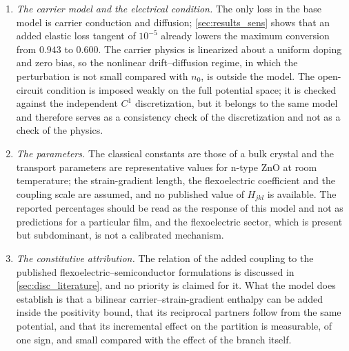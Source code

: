 \begin{enumerate}
scattering result does not rest on it.  The same holds for the traction itself: the weak
form of the edge condition closes to machine precision, but the pointwise traction is not identically zero.  At the
operating point its normalized norm away from the corners is $4.3\times10^{-2}$ at degree 10 and
$3.6\times10^{-2}$ at degree 28, while its maximum over the edge, which sits at the corners,
grows from $0.77$ to $2.4$ over the same range.  The free edge is therefore satisfied in the weak sense,
and a direct two-dimensional $x$--$z$ finite-element solution of the same variational problem, with the edge cells refined down to $0.00125\,d$, reproduces the modal backward share at the operating point to within $0.5$~\% (\cref{tab:fe2d}), with no systematic drift under refinement.  That check is made at the operating point only.  The same measurements settle what the
earlier band-energy argument could not: the strain-gradient energy in the outer
band $|z|>0.4\,d/2$ is $0.93$--$1.00$~\% of the total at the operating point,
$1.22$--$1.30$~\% at the maximum and $1.18$--$1.26$~\% at $k_xd=0.55$, and its
share decreases with degree, but the band average of the mixed hyperstress
exceeds the pointwise corner value by factors of five to ten, so no band average
is used here to argue the corner datum away.
\item \emph{The carrier model and the electrical condition.}  The only loss in the base model
is carrier conduction and diffusion; \cref{sec:results_sens} shows that an added
elastic loss tangent of $10^{-5}$ already lowers the maximum conversion from $0.943$ to $0.600$.  The carrier
physics is linearized about a uniform doping and zero bias, so the nonlinear
drift--diffusion regime, in which the perturbation is not small compared with
$n_0$, is outside the model.  The open-circuit condition is imposed weakly on the full potential space; it
is checked against the independent $C^{1}$ discretization, but it belongs to the same model and therefore serves as a consistency check of the discretization and not as a check of the physics.
\item \emph{The parameters.}  The classical constants are those of a bulk
crystal and the transport parameters are representative values for n-type ZnO at
room temperature; the strain-gradient length, the flexoelectric coefficient and
the coupling scale are assumed, and no published value of $H_{jkl}$ is available.
The reported percentages should be read as the response of this model
and not as predictions for a particular film, and the flexoelectric sector, which
is present but subdominant, is not a calibrated
mechanism.
\item \emph{The constitutive attribution.}  The relation of the added coupling
to the published flexoelectric--semiconductor formulations is discussed in \cref{sec:disc_literature}, and no priority is claimed for it.  What the
model does establish is that a bilinear carrier--strain-gradient enthalpy can be
added inside the positivity bound, that its reciprocal partners follow from the
same potential, and that its incremental effect on the partition is measurable,
of one sign, and small compared with the effect of the branch itself.
\end{enumerate}

